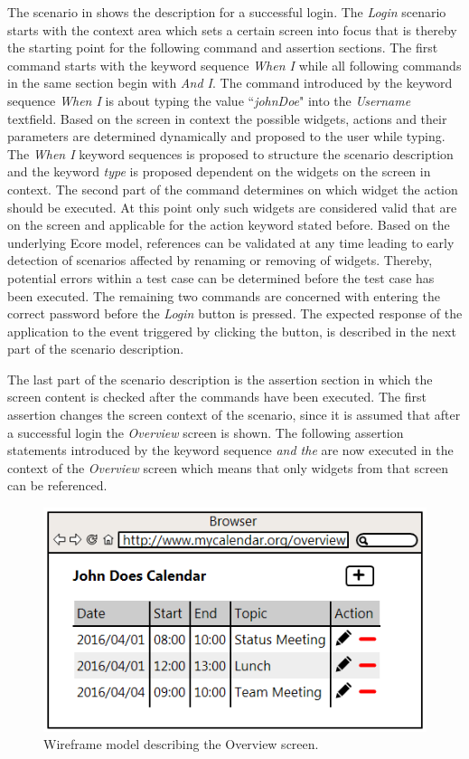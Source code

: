 \documentclass{sig-alternate-05-2015}
\begin{document}
The scenario in  shows the description for a successful login.
The \textit{Login} scenario starts with the context area which sets a certain screen into focus that is thereby the starting point for the following command and assertion sections.
The first command starts with the keyword sequence \textit{When I} while all following commands in the same section begin with \textit{And I}.
The command introduced by the keyword sequence \textit{When I} is about typing the value ``\textit{johnDoe}" into the \textit{Username} textfield. 
Based on the screen in context the possible widgets, actions and their parameters are determined dynamically and proposed to the user while typing.
The \textit{When I} keyword sequences is proposed to structure the scenario description and the keyword \textit{type} is proposed dependent on the widgets on the screen in context.
The second part of the command determines on which widget the action should be executed.
At this point only such widgets are considered valid that are on the screen and applicable for the action keyword stated before.
Based on the underlying Ecore model, references can be validated at any time leading to early detection of scenarios affected by renaming or removing of widgets.
Thereby, potential errors within a test case can be determined before the test case has been executed.
The remaining two commands are concerned with entering the correct password before the \textit{Login} button is pressed.
The expected response of the application to the event triggered by clicking the button, is described in the next part of the scenario description.

The last part of the scenario description is the assertion section in which the screen content is checked after the commands have been executed.
The first assertion changes the screen context of the scenario, since it is assumed that after a successful login the \textit{Overview} screen is shown.
The following assertion statements introduced by the keyword sequence \textit{and the} are now executed in the context of the \textit{Overview} screen which means that only widgets from that screen can be referenced.

\begin{figure}[h]
	\centering
	\includegraphics[width=0.8\linewidth]{Overview.png}
	\caption{Wireframe model describing the Overview screen.}
	\label{fig:overview}
\end{figure}
\end{document}
